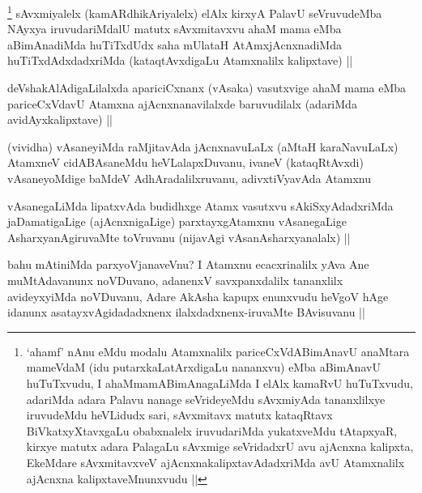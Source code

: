 
\begin{artha}
\footnote{`ahamf' nAnu eMdu modalu Atamxnalilx pariceCxVdABimAnavU anaMtara mameVdaM (idu putarxkaLatArxdigaLu nananxvu) eMba aBimAnavU huTuTxvudu, I ahaMmamABimAnagaLiMda I elAlx kamaRvU huTuTxvudu, adariMda adara Palavu nanage seVrideyeMdu sAvxmiyAda tananxlilxye iruvudeMdu heVLidudx sari, sAvxmitavx matutx kataqRtavx BiVkatxyXtavxgaLu obabxnalelx iruvudariMda yukatxveMdu tAtapxyaR, kirxye matutx adara PalagaLu sAvxmige seVridadxrU avu ajAcnxna kalipxta, EkeMdare sAvxmitavxveV ajAcnxnakalipxtavAdadxriMda avU Atamxnalilx ajAcnxna kalipxtaveMnunxvudu ||}
sAvxmiyalelx (kamARdhikAriyalelx) elAlx kirxyA PalavU seVruvudeMba NAyxya iruvudariMdalU matutx sAvxmitavxvu ahaM mama eMba aBimAnadiMda huTiTxdUdx saha mUlataH AtAmxjAcnxnadiMda huTiTxdAdxdadxriMda (kataqtAvxdigaLu Atamxnalilx kalipxtave) ||
\end{artha}


\begin{artha}
deVshakAlAdigaLilalxda apariciCxnanx (vAsaka) vasutxvige ahaM mama eMba pariceCxVdavU Atamxna ajAcnxnanavilalxde baruvudilalx (adariMda avidAyxkalipxtave) ||
\end{artha}

\begin{artha}
(vividha) vAsaneyiMda raMjitavAda jAcnxnavuLaLx (aMtaH karaNavuLaLx) AtamxneV cidABAsaneMdu heVLalapxDuvanu, ivaneV (kataqRtAvxdi) vAsaneyoMdige baMdeV AdhAradalilxruvanu, adivxtiVyavAda Atamxnu
\end{artha}


\begin{artha}
vAsanegaLiMda lipatxvAda budidhxge Atamx vasutxvu sAkiSxyAdadxriMda jaDamatigaLige (ajAcnxnigaLige) parxtayxgAtamxnu vAsanegaLige AsharxyanAgiruvaMte toVruvanu (nijavAgi vAsanAsharxyanalalx) ||
\end{artha}


\begin{artha}
bahu mAtiniMda parxyoVjanaveVnu? I Atamxnu ecacxrinalilx yAva Ane muMtAdavanunx noVDuvano, adanenxV savxpanxdalilx tananxlilx avideyxyiMda noVDuvanu, Adare AkAsha kapupx enunxvudu heVgoV hAge idanunx asatayxvAgidadadxnenx ilalxdadxnenx-iruvaMte BAvisuvanu ||
\end{artha}

